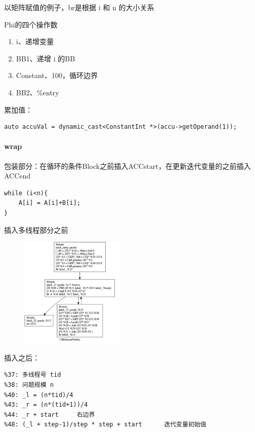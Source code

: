 \documentclass[a4paper]{exam}
\theoremstyle{definition}
\begin{document}
以矩阵赋值的例子，br是根据 i 和 n 的大小关系

Phi的四个操作数

\begin{enumerate}
\def\labelenumi{\arabic{enumi}.}
\item
  i、递增变量
\item
  BB1、递增 i 的BB
\item
  Constant、100，循环边界
\item
  BB2、\%entry
\end{enumerate}

累加值：

\begin{verbatim}
auto accuVal = dynamic_cast<ConstantInt *>(accu->getOperand(1));
\end{verbatim}

\hypertarget{wrap}{%
\paragraph{wrap}\label{wrap}}

包装部分：在循环的条件Block之前插入ACCstart，在更新迭代变量的之前插入ACCend

\begin{verbatim}
while (i<n){
	A[i] = A[i]+B[i];
}
\end{verbatim}

插入多线程部分之前

\begin{figure}[htbp]
  \centering
  \includegraphics[width=5cm]{./img/0.png}
\end{figure}

插入之后：

\begin{verbatim}
%37: 多线程号 tid
%38: 问题规模 n
%40: _l = (n*tid)/4 
%43: _r = (n*(tid+1))/4
%44: _r + start		右边界
%48: (_l + step-1)/step * step + start		迭代变量初始值
\end{verbatim}
\end{document}
